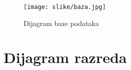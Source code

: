 				\begin{figure}[H]
					\texttt{[image: slike/baza.jpg]}
					\centering
					\caption{Dijagram baze podataka}
					\label{fig:baza}
				\end{figure}
			
			
			\eject
			
			
		\section{Dijagram razreda}
		
%			
%			

			

			
%			
			
			
			
			\eject
		
%			
%			
%			
%			
%			
%		
%			
%			
%			
%		
%		
